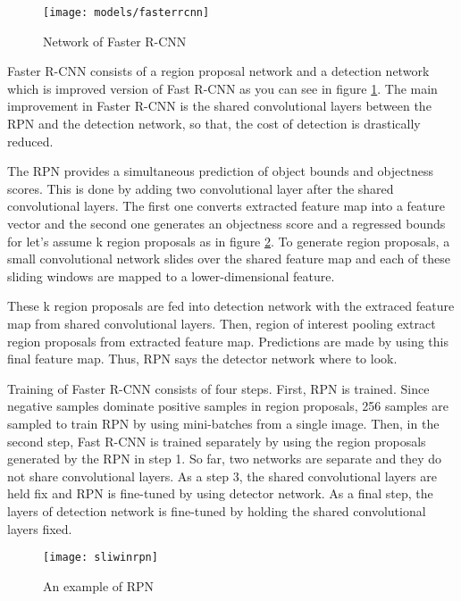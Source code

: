 \documentclass{article}
\begin{document}
\setlength{\parindent}{6ex}

\begin{figure}
    \centering
    \texttt{[image: models/fasterrcnn]}
    \caption{Network of Faster R-CNN}
    \label{fig:fasterrcnn1}
\end{figure}

\indent

Faster R-CNN consists of a region proposal network and a detection network which 
is improved version of Fast R-CNN as you can see in figure \ref{fig:fasterrcnn1}. 
The main improvement in Faster R-CNN is the shared convolutional layers between 
the RPN and the detection network, so that, the cost of detection is drastically 
reduced. \par

The RPN provides a simultaneous prediction of object bounds and 
objectness scores. This is done by adding two convolutional layer after the 
shared convolutional layers. The first one converts extracted feature map into a 
feature vector and the second one generates an objectness score and a regressed 
bounds for let's assume k region proposals as in figure \ref{fig:sliwinrpn1}. To 
generate region proposals, a small convolutional network slides over the shared 
feature map and each of these sliding windows are mapped to a lower-dimensional 
feature. \par

These k region proposals are fed into detection network with the extraced feature 
map from shared convolutional layers. Then, region of interest pooling extract 
region proposals from extracted feature map. Predictions are made by using this 
final feature map. Thus, RPN says the detector network where to look. \par

Training of Faster R-CNN consists of four steps. First, RPN is trained. Since 
negative samples dominate positive samples in region proposals, 256 samples are 
sampled to train RPN by using mini-batches from a single image. Then, in the 
second step, Fast R-CNN is trained separately by using the region proposals 
generated by the RPN in step 1. So far, two networks are separate and they do 
not share convolutional layers. As a step 3, the shared convolutional layers are 
held fix and RPN is fine-tuned by using detector network. As a final step, the 
layers of detection network is fine-tuned by holding the shared convolutional layers 
fixed.
\begin{figure}
    \centering
    \texttt{[image: sliwinrpn]}
    \caption{An example of RPN}
    \label{fig:sliwinrpn1}
\end{figure}
\end{document}

